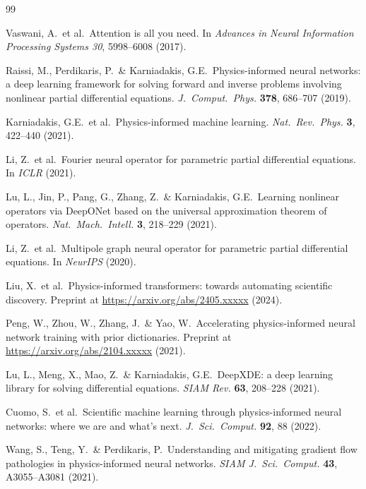 \documentclass[11pt,a4paper]{article}
\begin{document}

\begin{thebibliography}{99}

 Vaswani, A.\ et al.\ Attention is all you
need. In \emph{Advances in Neural Information Processing Systems 30},
5998--6008 (2017).

 Raissi, M., Perdikaris, P.\ \& Karniadakis,
G.E.\ Physics-informed neural networks: a deep learning framework for solving
forward and inverse problems involving nonlinear partial differential
equations. \emph{J.\ Comput.\ Phys.} \textbf{378}, 686--707 (2019).

 Karniadakis, G.E.\ et al.\ Physics-informed
machine learning. \emph{Nat.\ Rev.\ Phys.} \textbf{3}, 422--440 (2021).

 Li, Z.\ et al.\ Fourier neural operator for
parametric partial differential equations. In \emph{ICLR} (2021).

 Lu, L., Jin, P., Pang, G., Zhang, Z.\ \&
Karniadakis, G.E.\ Learning nonlinear operators via DeepONet based on the
universal approximation theorem of operators. \emph{Nat.\ Mach.\ Intell.}
\textbf{3}, 218--229 (2021).

 Li, Z.\ et al.\ Multipole graph neural operator for
parametric partial differential equations. In \emph{NeurIPS} (2020).

 Liu, X.\ et al.\ Physics-informed transformers:
towards automating scientific discovery. Preprint at
\url{https://arxiv.org/abs/2405.xxxxx} (2024).

 Peng, W., Zhou, W., Zhang, J.\ \& Yao, W.\ Accelerating
physics-informed neural network training with prior dictionaries. Preprint at
\url{https://arxiv.org/abs/2104.xxxxx} (2021).

 Lu, L., Meng, X., Mao, Z.\ \& Karniadakis, G.E.\
DeepXDE: a deep learning library for solving differential equations.
\emph{SIAM Rev.} \textbf{63}, 208--228 (2021).

 Cuomo, S.\ et al.\ Scientific machine learning
through physics-informed neural networks: where we are and what's next.
\emph{J.\ Sci.\ Comput.} \textbf{92}, 88 (2022).

 Wang, S., Teng, Y.\ \& Perdikaris, P.\
Understanding and mitigating gradient flow pathologies in physics-informed
neural networks. \emph{SIAM J.\ Sci.\ Comput.} \textbf{43}, A3055--A3081
(2021).


\end{thebibliography}
\end{document}
